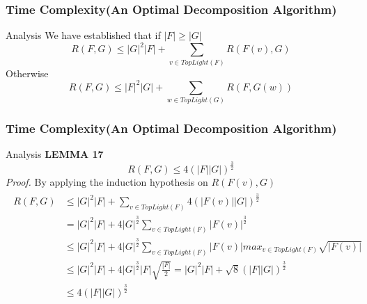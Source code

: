 \documentclass{beamer}
\begin{document}
\begin{frame}
\frametitle{Time Complexity(An Optimal Decomposition Algorithm)}
\begin{block}{Analysis}
We have established that if $\left\vert F \right\vert \geq \left\vert G \right\vert$
\begin{displaymath}
R(F, G) \leq \left\vert G \right\vert^2 \left\vert F \right\vert + \sum_{v \in TopLight(F)}R(F(v), G)
\end{displaymath}
Otherwise
\begin{displaymath}
R(F, G) \leq \left\vert F \right\vert^2 \left\vert G \right\vert + \sum_{w \in TopLight(G)}R(F, G(w))
\end{displaymath}
\end{block}
\end{frame}

\begin{frame}
\frametitle{Time Complexity(An Optimal Decomposition Algorithm)}
\begin{block}{Analysis}
\textbf{LEMMA 17} 
\begin{displaymath}
R(F, G) \leq 4(\left\vert F \right\vert \left\vert G \right\vert)^{\frac{3}{2}}
\end{displaymath}
\emph{Proof.}
By applying the induction hypothesis on $R(F(v), G)$
\begin{eqnarray*}
\begin{split}
R(F, G) & \leq \left\vert G \right\vert^2 \left\vert F \right\vert + \sum_{v \in TopLight(F)}4(\left\vert F(v) \right\vert \left\vert G \right\vert)^{\frac{3}{2}}\\
& = \left\vert G \right\vert^2 \left\vert F \right\vert + 4 \left\vert G \right\vert^{\frac{3}{2}}\sum_{v \in TopLight(F)}\left\vert F(v)\right\vert^{\frac{3}{2}}\\
& \leq \left\vert G \right\vert^2 \left\vert F \right\vert + 4 \left\vert G \right\vert^{\frac{3}{2}}\sum_{v \in TopLight(F)}\left\vert F(v)\right\vert max_{v \in TopLight(F)}\sqrt{\left\vert F(v) \right\vert}\\
& \leq \left\vert G \right\vert^2 \left\vert F \right\vert + 4 \left\vert G \right\vert^{\frac{3}{2}}\left\vert F \right\vert \sqrt{\frac{\left\vert F \right\vert}{2}} = \left\vert G \right\vert^2 \left\vert F \right\vert + \sqrt{8}(\left\vert F \right\vert \left\vert G \right\vert)^{\frac{3}{2}} \\
& \leq 4(\left\vert F \right\vert \left\vert G \right\vert)^{\frac{3}{2}}\\
\end{split}
\end{eqnarray*}


\end{block}
\end{frame}
\end{document}
